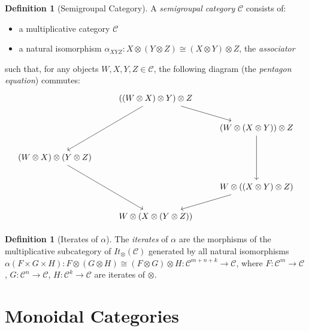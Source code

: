 \documentclass{book}
\theoremstyle{definition}
\newtheorem{df}[lm]{Definition}
\begin{document}
  \begin{df}[Semigroupal Category]
    A \emph{semigroupal category} $\mathcal{C}$ consists of:
    \begin{itemize}
      \item a multiplicative category $\mathcal{C}$
      \item a natural isomorphism $\alpha_{XYZ} : X \otimes (Y \otimes Z) \cong 
      (X 
      \otimes Y) \otimes Z$, the \emph{associator}
    \end{itemize}
    such that, for any objects $W, X, Y, Z \in \mathcal{C}$, the following 
    diagram 
    (the \emph{pentagon equation}) commutes:
    \[ \begin{tikzcd}
      & ((W \otimes X) \otimes Y) \otimes Z \ar[ddl] \ar[dr] \\
      & & (W \otimes (X \otimes Y)) \otimes Z \ar[dd] \\
      (W \otimes X) \otimes (Y \otimes Z) \ar[ddr] \\
      & & W \otimes ((X \otimes Y) \otimes Z) \ar[dl] \\
      & W \otimes (X \otimes (Y \otimes Z))
    \end{tikzcd} \]
  \end{df}
  
  \begin{df}[Iterates of $\alpha$]
    The \emph{iterates} of $\alpha$ are the morphisms of the multiplicative 
    subcategory of $It_\otimes(\mathcal{C})$ generated by all natural 
    isomorphisms
    $\alpha(F \times G \times H) : F \otimes (G \otimes 
    H) \cong (F \otimes G) \otimes H : \mathcal{C}^{m + n + k} \rightarrow 
    \mathcal{C}$, where $F : \mathcal{C}^m \rightarrow \mathcal{C}$, $G : 
    \mathcal{C}^n 
    \rightarrow \mathcal{C}$, $H : \mathcal{C}^k \rightarrow \mathcal{C}$ are 
    iterates of $\otimes$.
  \end{df}
  
  \section{Monoidal Categories}
  
\end{document}
